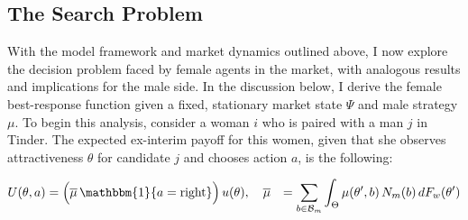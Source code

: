 %  


\begin{comment}
\begin{equation} 
    \underbrace{\lambda_m \Big( F_m(\theta'')-F_m(\theta') \Big)}_{\text{Entering Agents}}\;=\;\underbrace{(1-\delta)N^m(\sigma)}_{\text{Exogenous Deaths}}+\quad  \underbrace{\delta N^m(\sigma)  G^m_b(1 \,|\, \sigma)\int_{\Theta}\sigma_m(\theta,1)\,dG^w_\theta(\theta \,|\, \sigma)}_{\text{Expended Budgets}} 
\end{equation} 

\begin{equation}
    \underbrace{\left(\delta  \int_{\Theta}\sigma_m(\theta,b+1)\,dw_\theta(\theta \,|\, \sigma)\right)N_mR^m_{b+1}}_{\text{Transitions into budget b}}\;=\;\underbrace{\left((1-\delta)+\delta \int_{\Theta} \sigma_m(\theta,b)\,dw_\theta(\theta \,|\, \sigma)\right)N^m R^m_{b}}_{\text{Transitions out of budget b}}
\end{equation}

\begin{equation}
    \underbrace{\lambda_m \Big(F_m(\theta'')-F_m(\theta')\Big)}_{\text{Transitions into budget level B}}\;=\;\underbrace{\left((1-\delta)+\delta \int_{\Theta} \mu(\theta,b)\,dw_\theta(\theta \,|\, \sigma)\right)N_mR^m_{B}}_{\text{Transitions out of budget level B}}
\end{equation} 
\end{comment} 


\subsection{The Search Problem}\label{sec:section2.3}
With the model framework and market dynamics outlined above, I now explore the decision problem faced by female agents in the market, with analogous results and implications for the male side. In the discussion below, I derive the female best-response function given a fixed, stationary market state $\Psi$ and male strategy $\mu$. To begin this analysis, consider a woman $i$ who is paired with a man $j$ in Tinder. The expected ex-interim payoff for this women, given that she observes attractiveness $\theta$ for candidate $j$ and chooses action $a$, is the following:

\begin{equation*}
    \begin{aligned}
        U(\theta, a)&=\Big(\overline{\mu}\,\mathbbm{1}\{a=\text{right}\}\Big)\,u(\theta), \quad \overline{\mu} &= \sum_{b\in \mathcal{B}_m}\int_{\Theta} \mu(\theta',b)\,{N}_m(b)\,dF_w(\theta')
    \end{aligned} 
\end{equation*}

